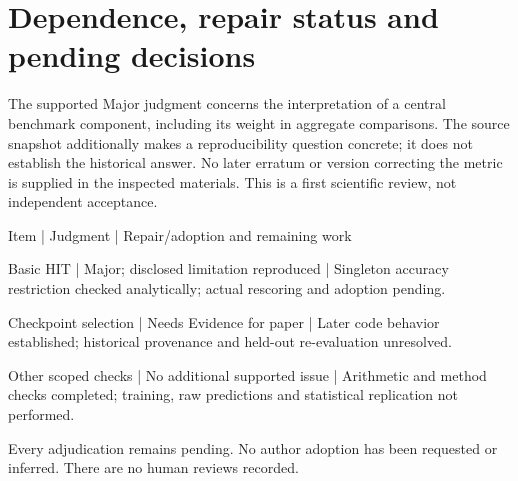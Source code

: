 \documentclass[10pt]{article}
\begin{document}
\section*{Dependence, repair status and pending decisions}
The supported Major judgment concerns the interpretation of a central benchmark component, including its weight in aggregate comparisons. The source snapshot additionally makes a reproducibility question concrete; it does not establish the historical answer. No later erratum or version correcting the metric is supplied in the inspected materials. This is a first scientific review, not independent acceptance.\par
Item | Judgment | Repair/adoption and remaining work\par
Basic HIT | Major; disclosed limitation reproduced | Singleton accuracy restriction checked analytically; actual rescoring and adoption pending.\par
Checkpoint selection | Needs Evidence for paper | Later code behavior established; historical provenance and held-out re-evaluation unresolved.\par
Other scoped checks | No additional supported issue | Arithmetic and method checks completed; training, raw predictions and statistical replication not performed.\par
Every adjudication remains pending. No author adoption has been requested or inferred. There are no human reviews recorded.\par
\end{document}
